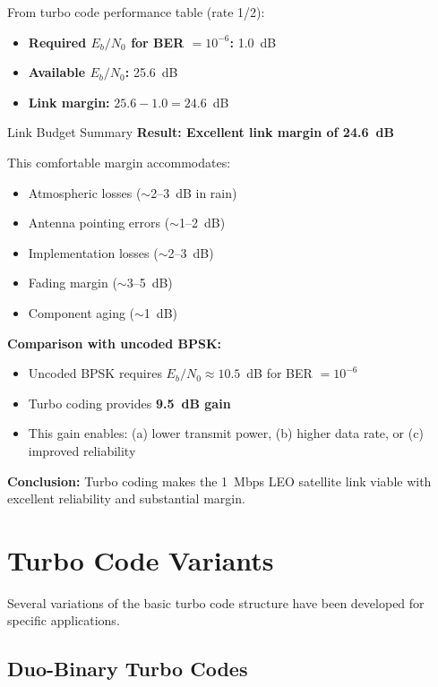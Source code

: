 From turbo code performance table (rate 1/2):
\begin{itemize}
\item \textbf{Required $E_b/N_0$ for BER $= 10^{-6}$:} 1.0~dB
\item \textbf{Available $E_b/N_0$:} 25.6~dB
\item \textbf{Link margin:} $25.6 - 1.0 = 24.6$~dB
\end{itemize}

\begin{calloutbox}[colback=black!8!white,colframe=black]{Link Budget Summary}
\textbf{Result: Excellent link margin of 24.6~dB}

This comfortable margin accommodates:
\begin{itemize}
\item Atmospheric losses ($\sim$2--3~dB in rain)
\item Antenna pointing errors ($\sim$1--2~dB)
\item Implementation losses ($\sim$2--3~dB)
\item Fading margin ($\sim$3--5~dB)
\item Component aging ($\sim$1~dB)
\end{itemize}

\textbf{Comparison with uncoded BPSK:}
\begin{itemize}
\item Uncoded BPSK requires $E_b/N_0 \approx 10.5$~dB for BER $= 10^{-6}$
\item Turbo coding provides \textbf{9.5~dB gain}
\item This gain enables: (a) lower transmit power, (b) higher data rate, or (c) improved reliability
\end{itemize}

\textbf{Conclusion:} Turbo coding makes the 1~Mbps LEO satellite link viable with excellent reliability and substantial margin.
\end{calloutbox}

\section{Turbo Code Variants}

Several variations of the basic turbo code structure have been developed for specific applications.

\subsection{Duo-Binary Turbo Codes}

